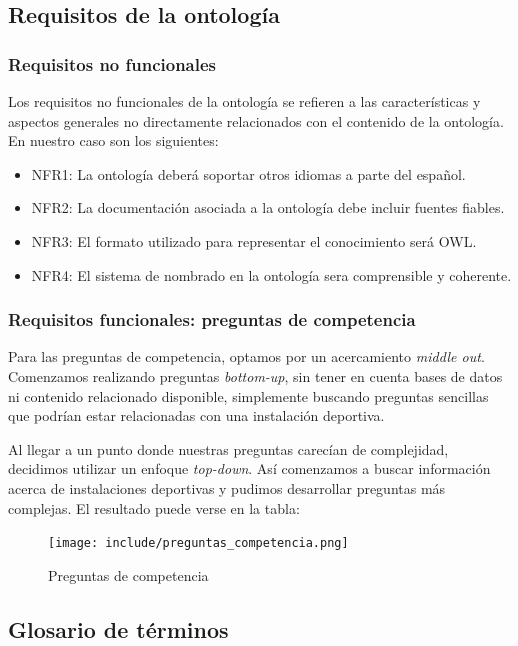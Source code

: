 \documentclass[a4paper,12pt]{article}
\begin{document}
	\subsection{Requisitos de la ontología}
	
	\subsubsection{Requisitos no funcionales}
	Los requisitos no funcionales de la ontología se refieren a las características y aspectos generales no directamente relacionados con el contenido de la ontología. En nuestro caso son los siguientes:
	\begin{itemize}
		\item NFR1: La ontología deberá soportar otros idiomas a parte del español.
		\item NFR2: La documentación asociada a la ontología debe incluir fuentes fiables.
		\item NFR3: El formato utilizado para representar el conocimiento será OWL.
		\item NFR4: El sistema de nombrado en la ontología sera comprensible y coherente.
	\end{itemize}

	\subsubsection{Requisitos funcionales:  preguntas de competencia}
	Para las preguntas de competencia, optamos por un acercamiento \textit{middle out}. Comenzamos realizando preguntas \textit{bottom-up}, sin tener en cuenta bases de datos ni contenido relacionado disponible, simplemente buscando preguntas sencillas que podrían estar relacionadas con una instalación deportiva. 
	
	Al llegar a un punto donde nuestras preguntas carecían de complejidad, decidimos utilizar un enfoque \textit{top-down}. Así comenzamos a buscar información acerca de instalaciones deportivas y pudimos desarrollar preguntas más complejas. El resultado puede verse en la tabla:
	\begin{figure}[H]
		\centering
		\texttt{[image: include/preguntas\_competencia.png]}
		\caption{Preguntas de competencia}
	\end{figure}
	
	\subsection{Glosario de términos}
	
\end{document}
